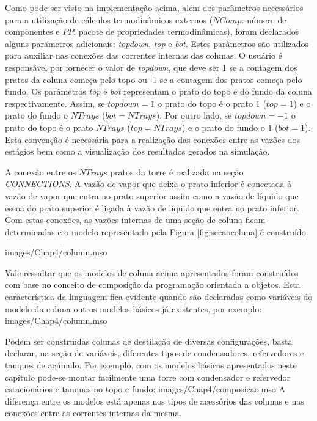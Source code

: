 Como pode ser visto na implementação acima, além dos parâmetros necessários para a utilização de cálculos
termodinâmicos externos ($NComp$: número de componentes e $PP$: pacote de propriedades termodinâmicas),
foram declarados alguns parâmetros adicionais: \textit{topdown}, \textit{top} e \textit{bot}.
Estes parâmetros são utilizados para auxiliar nas conexões das correntes internas das colunas. O usuário é responsável
por fornecer o valor de \textit{topdown}, que deve ser 1 se a contagem dos pratos da coluna começa pelo topo
ou -1 se a contagem dos pratos começa pelo fundo. Os parâmetros \textit{top} e \textit{bot} representam
o prato do topo e do fundo da coluna respectivamente. Assim, se $topdown = 1$ o prato do topo é o prato $1$ ($top=1$)
e o prato do fundo o $NTrays$  ($bot = NTrays$). Por outro lado, se $topdown = -1$ o prato do topo
é o prato $NTrays$ ($top=NTrays$) e o prato do fundo o $1$ ($bot = 1$). Esta convenção é necessária para
a realização das conexões entre as vazões dos estágios bem como a visualização dos resultados gerados na simulação.

A conexão entre os $NTrays$ pratos da torre é realizada na seção \textit{CONNECTIONS}. A vazão de vapor que
deixa o prato inferior é conectada à vazão de vapor que entra no prato superior assim como a vazão de líquido
que escoa do prato superior é ligada à vazão de líquido que entra no prato inferior. Com estas conexões, as vazões
internas de uma seção de coluna ficam determinadas e o modelo representado pela Figura \autoref{fig:secaocoluna} é
construído.

 {images/Chap4/column.mso}

Vale ressaltar que os modelos de coluna acima apresentados foram construídos com base no conceito de composição
da programação orientada a objetos. Esta característica da linguagem fica evidente quando são declaradas
como variáveis do modelo da coluna outros modelos básicos já existentes, por exemplo:
 {images/Chap4/column.mso}

Podem ser construídas colunas de destilação de diversas configurações, basta
declarar, na seção de variáveis, diferentes tipos de condensadores,
refervedores e tanques de acúmulo.
Por exemplo, com os modelos básicos apresentados neste capítulo pode-se montar
facilmente uma torre com condensador e refervedor estacionários e tanques no topo e fundo:
 {images/Chap4/composicao.mso}
A diferença entre os modelos está apenas nos tipos de acessórios das colunas e nas conexões entre as correntes internas
da mesma.

